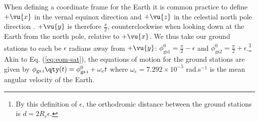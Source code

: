 \begin{figure}
    \caption{}
    \label{fig:scheme}
\end{figure}

When defining a coordinate frame for the Earth it is common practice to define $+\vu{x}$ in the vernal equinox direction and $+\vu{z}$ in the celestial north pole direction \cite{curtis2005}. $+\vu{y}$ is therefore $\frac\pi2$, counterclockwise when looking down at the Earth from the north pole, relative to $+\vu{x}$. We thus take our ground stations to each be $\epsilon$ radians away from $+\vu{y}$: $\phi_{\text{gs1}}^0 = \frac\pi2 - \epsilon$ and $\phi_{\text{gs2}}^0 = \frac\pi2 + \epsilon$.\footnote{By this definition of \(\epsilon\), the orthodromic distance between the ground stations is $d = 2 R_e \epsilon$.} Akin to Eq. (\ref{eq:eom-sat}), the equations of motion for the ground stations are given by \(\phi_{\text{gs}\,i}\qty(t) = \phi_{\text{gs}\,i}^0 + \omega_e t\) where $\omega_e = 7.292 \times 10^{-5}$ rad$.$s$^{-1}$ \cite{luzum2011} is the mean angular velocity of the Earth.



